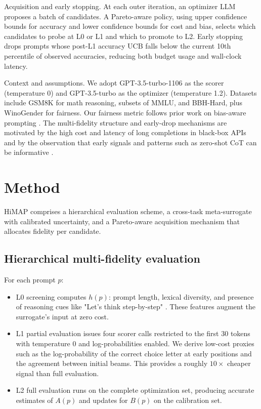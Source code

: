 \documentclass{article}
\begin{document}
Acquisition and early stopping. At each outer iteration, an optimizer LLM proposes a batch of candidates. A Pareto-aware policy, using upper confidence bounds for accuracy and lower confidence bounds for cost and bias, selects which candidates to probe at L0 or L1 and which to promote to L2. Early stopping drops prompts whose post-L1 accuracy UCB falls below the current 10th percentile of observed accuracies, reducing both budget usage and wall-clock latency.

Context and assumptions. We adopt GPT-3.5-turbo-1106 as the scorer (temperature 0) and GPT-3.5-turbo as the optimizer (temperature 1.2). Datasets include GSM8K for math reasoning, subsets of MMLU, and BBH-Hard, plus WinoGender for fairness. Our fairness metric follows prior work on bias-aware prompting \cite{ma-2023-fairness}. The multi-fidelity structure and early-drop mechanisms are motivated by the high cost and latency of long completions in black-box APIs and by the observation that early signals and patterns such as zero-shot CoT can be informative \cite{kojima-2022-large}.

\section{Method}
HiMAP comprises a hierarchical evaluation scheme, a cross-task meta-surrogate with calibrated uncertainty, and a Pareto-aware acquisition mechanism that allocates fidelity per candidate.

\subsection{Hierarchical multi-fidelity evaluation}
For each prompt \(p\):
\begin{itemize}
  \item L0 screening computes \(h(p)\): prompt length, lexical diversity, and presence of reasoning cues like "Let's think step-by-step" \cite{kojima-2022-large}. These features augment the surrogate's input at zero cost.
  \item L1 partial evaluation issues four scorer calls restricted to the first 30 tokens with temperature 0 and log-probabilities enabled. We derive low-cost proxies such as the log-probability of the correct choice letter at early positions and the agreement between initial beams. This provides a roughly \(10\times\) cheaper signal than full evaluation.
  \item L2 full evaluation runs on the complete optimization set, producing accurate estimates of \(A(p)\) and updates for \(B(p)\) on the calibration set.
\end{itemize}
\end{document}
